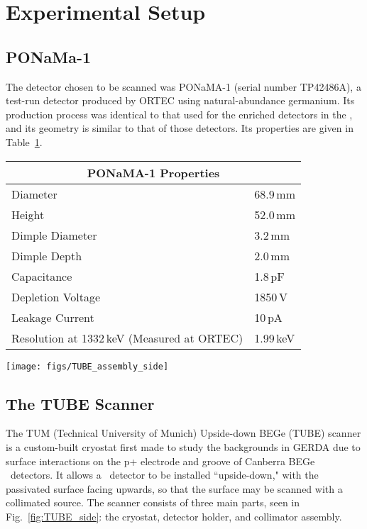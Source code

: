 \documentclass[groupedaddress,rmp,amsmath,amssymb,bibnotes,altaffilletter,twocolumn]{revtex4-1}
\begin{document}
\section{Experimental Setup}
\subsection{PONaMa-1}
The detector chosen to be scanned was PONaMA-1 (serial number TP42486A), a test-run detector produced by ORTEC using natural-abundance germanium. Its production process was identical to that used for the enriched detectors in the \DEM, and its geometry is similar to that of those detectors. Its properties are given in Table~\ref{tab:PONaMA_specs}. 

\begin{table}[]
\begin{tabular}{p{4cm} | l}
\hline
\multicolumn{2}{c}{PONaMA-1 Properties} \\
\hline
Diameter & 68.9\,mm \\ 
Height & 52.0\,mm \\ 
Dimple Diameter & 3.2\,mm \\
Dimple Depth & 2.0\,mm \\
Capacitance & 1.8\,pF \\
Depletion Voltage & 1850\,V \\
Leakage Current & 10\,pA \\
Resolution at 1332\,keV \newline (Measured at ORTEC) & 1.99\,keV \\
\end{tabular}
 \label{tab:PONaMA_specs}
\end{table}

\begin{figure*}[p]
 \centering
 \texttt{[image: figs/TUBE\_assembly\_side]}
 \caption{A simplified bisected view of the TUBE scanner, showing key dimensions. The thermal braids connecting the IR umbrella to the IR cup and the mylar covering of the IR umbrella are not shown. Details of the detector cup, front-end electronics, and cold-finger are also removed for clarity.} 
 \label{fig:TUBE_side}
\end{figure*}

\subsection{The TUBE Scanner}
The TUM (Technical University of Munich) Upside-down BEGe (TUBE) scanner is a custom-built cryostat first made to study the backgrounds in GERDA due to surface interactions on the p+ electrode and groove of Canberra BEGe \ppc\ detectors. It allows a \ppc\ detector to be installed ``upside-down," with the passivated surface facing upwards, so that the surface may be scanned with a collimated source. The scanner consists of three main parts, seen in Fig.~\ref{fig:TUBE_side}: the cryostat, detector holder, and collimator assembly. 
\end{document}
